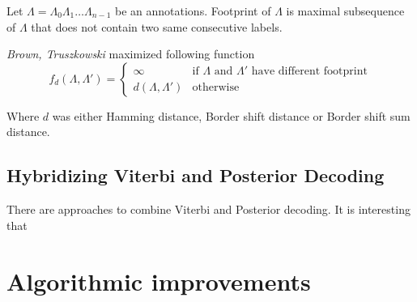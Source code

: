 \begin{definition}
Let $\Lambda=\Lambda_0\Lambda_1\dots\Lambda_{n-1}$ be an annotations. Footprint
of $\Lambda$ is maximal subsequence of $\Lambda$ that does not contain two same
consecutive labels.
\end{definition}

{\it Brown,
Truszkowski} maximized following function
\begin{equation}
f_d(\Lambda,\Lambda') = 
\begin{cases}
\infty & \text{if $\Lambda$ and $\Lambda'$ have different footprint}\\
d(\Lambda,\Lambda') & \text{otherwise}
\end{cases}
\end{equation}

Where $d$ was either Hamming distance, Border shift distance or Border shift sum
distance\cite{}.


\subsection{Hybridizing Viterbi and Posterior Decoding}

There are approaches to combine Viterbi and Posterior decoding. It is
interesting that 


\section{Algorithmic improvements}












